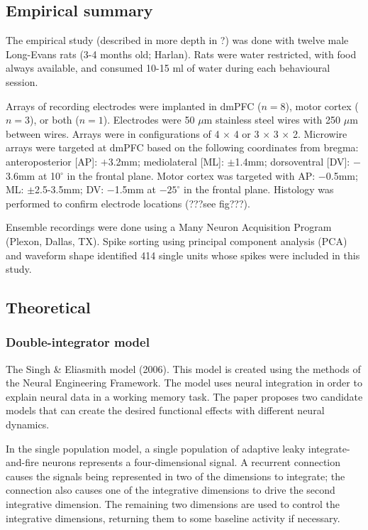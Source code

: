 \documentclass[12pt]{article}
\begin{document}
\subsection{Empirical summary}

The empirical study (described in more depth in ?) %
was done with twelve male Long-Evans rats (3-4 months old; Harlan).
Rats were water restricted, with food always available,
and consumed 10-15 ml of water during each
behavioural session.

Arrays of recording electrodes were implanted
in dmPFC ($n = 8$), motor cortex ($n = 3$), or both ($n = 1$).
Electrodes were 50 $\mu$m stainless steel wires
with 250 $\mu$m between wires.
Arrays were in configurations of
4 $\times$ 4 or 3 $\times$ 3 $\times$ 2.
Microwire arrays were targeted at dmPFC
based on the following coordinates from bregma:
anteroposterior [AP]: $+$3.2mm;
mediolateral [ML]: $\pm$1.4mm;
dorsoventral [DV]: $-$3.6mm at 10$^\circ$ in the frontal plane.
Motor cortex was targeted with
AP: $-$0.5mm; ML: $\pm$2.5-3.5mm;
DV: $-$1.5mm at $-25^\circ$ in the frontal plane.
Histology was performed to confirm electrode locations
(???see fig???).

Ensemble recordings were done using a
Many Neuron Acquisition Program (Plexon, Dallas, TX).
Spike sorting using principal component analysis (PCA)
and waveform shape identified 414 single units
whose spikes were included in this study.

\subsection{Theoretical}

\subsubsection{Double-integrator model}


The Singh \& Eliasmith model (2006).
This model is created using the methods of the
Neural Engineering Framework.
The model uses neural integration in order to explain
neural data in a working memory task.
The paper proposes two candidate models
that can create the desired functional effects
with different neural dynamics.

In the single population model, a single population of
adaptive leaky integrate-and-fire neurons represents
a four-dimensional signal.
A recurrent connection causes the signals
being represented in two of the dimensions
to integrate; the connection
also causes one of the integrative dimensions
to drive the second integrative dimension.
The remaining two dimensions are used
to control the integrative dimensions,
returning them to some baseline activity if necessary.
\end{document}
